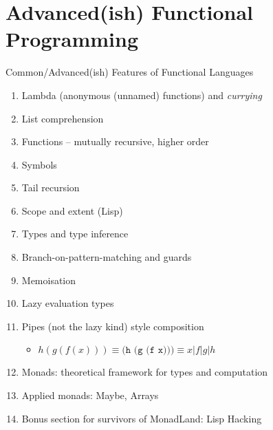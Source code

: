 \documentclass[presentation]{beamer}
\begin{document}
\section{Advanced(ish) Functional Programming}
\begin{frame}{Common/Advanced(ish) Features of Functional Languages}
\label{sec:org95ddb74}

\begin{enumerate}
\item Lambda (anonymous (unnamed) functions) and \emph{currying}
\item List comprehension
\item Functions -- mutually recursive, higher order
\item Symbols
\item Tail recursion
\item Scope and extent (Lisp)
\item Types and type inference
\item Branch-on-pattern-matching and guards
\item Memoisation
\item Lazy evaluation types
\item Pipes (not the lazy kind) style composition
\begin{itemize}
\item  \(h(g(f(x)))\equiv\texttt{(h (g (f x)))}\equiv{}x\vert{f}\vert{g}\vert{h}\)
\end{itemize}
\item Monads: theoretical framework for types and computation
\item Applied monads: Maybe, Arrays
\item Bonus section for survivors of MonadLand: Lisp Hacking
\end{enumerate}

\end{frame}
\end{document}
